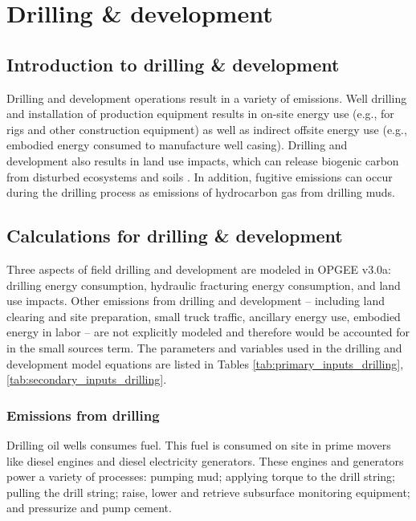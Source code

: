 \documentclass[11pt]{report}
\newcommand{\version}{v3.0a}
\begin{document}
\clearpage
\section{Drilling \& development}\label{sec:drilling}

\subsection{Introduction to drilling \& development}

Drilling and development operations result in a variety of emissions. Well drilling and installation of production equipment results in on-site energy use (e.g., for rigs and other construction equipment) as well as indirect offsite energy use (e.g., embodied energy consumed to manufacture well casing). Drilling and development also results in land use impacts, which can release biogenic carbon from disturbed ecosystems and soils \cite{Yeh2010}. In addition, fugitive emissions can occur during the drilling process as emissions of hydrocarbon gas from drilling muds. 

\subsection{Calculations for drilling \& development}

Three aspects of field drilling and development are modeled in OPGEE \version: drilling energy consumption, hydraulic fracturing energy consumption, and land use impacts. Other emissions from drilling and development -- including land clearing and site preparation, small truck traffic, ancillary energy use, embodied energy in labor -- are not explicitly modeled and therefore would be accounted for in the small sources term. The parameters and variables used in the drilling and development model equations are listed in Tables \ref{tab:primary_inputs_drilling}, \ref{tab:secondary_inputs_drilling}.

\subsubsection{Emissions from drilling}

Drilling oil wells consumes fuel. This fuel is consumed on site in prime movers like diesel engines and diesel electricity generators. These engines and generators power a variety of processes: pumping mud; applying torque to the drill string; pulling the drill string; raise, lower and retrieve subsurface monitoring equipment; and pressurize and pump cement. 
\end{document}
